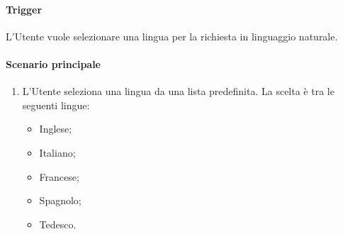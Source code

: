 \paragraph*{Trigger}
L'Utente vuole selezionare una lingua per la richiesta in linguaggio naturale.

\paragraph*{Scenario principale}
\begin{enumerate}
  \item L'Utente seleziona una lingua da una lista predefinita. La scelta è tra le seguenti lingue:
    \begin{itemize}
      \item Inglese;
      \item Italiano;
      \item Francese;
      \item Spagnolo;
      \item Tedesco.
    \end{itemize}
\end{enumerate}

